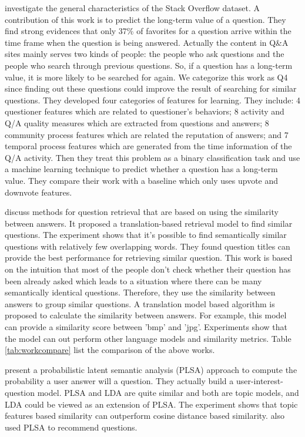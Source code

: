 \cite{anderson2012discovering} investigate the general characteristics of the Stack Overflow dataset. A contribution of this work is to predict the long-term value of a question. They find strong evidences that only 37\% of favorites for a question arrive within the time frame when the question is being answered. Actually the content in Q\&A sites mainly serves two kinds of people: the people who ask questions and the people who search through previous questions. So, if a question has a long-term value, it is more likely to be searched for again. We categorize this work as Q4 since finding out these questions could improve the result of searching for similar questions. They developed four categories of features for learning. They include: 4 questioner features which are related to questioner's behaviors; 8 activity and Q/A quality measures which are extracted from questions and answers; 8 community process features which are related the reputation of answers; and 7 temporal process features which are generated from the time information of the Q/A activity.
Then they treat this problem as a binary classification task and use a machine learning technique to predict whether a question has a long-term value. They compare their work with a baseline which only uses upvote and downvote features. 

\cite{chp2jeon2005finding}
discuss methods for question retrieval that are based on using the similarity between answers. It proposed a translation-based retrieval model to find similar questions. The experiment shows that it's possible to find semantically similar questions with relatively few overlapping words.
They found question titles can provide the best performance for retrieving similar question. This work is based on the intuition that most of the people don't check whether their question has been already asked which leads to a situation where there can be many semantically identical questions. Therefore, they use the similarity between answers to group similar questions. A translation model based algorithm is proposed to calculate the similarity between answers. For example, this model can provide a similarity score between 'bmp' and 'jpg'. Experiments show that the model can out perform other language models and similarity metrics. 
Table \ref{tab:workcompare} list the comparison of the above works.

\cite{chp2Qu:2009:WWW:PLSA:SimlarQ} 
present a probabilistic latent semantic analysis (PLSA) approach to compute the probability a user answer will a question. They actually build a user-interest-question model. PLSA and LDA are quite similar and both are topic models, and LDA could be viewed as an extension of PLSA. The experiment shows that topic features based similarity can outperform cosine distance based similarity. \cite{chp2Wu:2008:PLSA:SimlarQ} also used PLSA to recommend questions.

